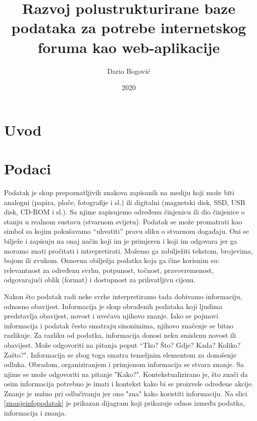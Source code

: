\documentclass{foi}
\title{Razvoj polustrukturirane baze podataka za potrebe internetskog foruma kao web-aplikacije}
\author{Dario Bogović}
\date{2020}
\begin{document}
\maketitle

\tableofcontents

\pagestyle{plain}
\chapter{Uvod}

\chapter{Podaci}

Podatak je skup prepoznatljivih znakova zapisanih na mediju koji može biti analogni (papira, ploče, fotografije i sl.)  ili digitalni (magnetski disk, SSD, USB disk, CD-ROM i sl.). Sa njime zapisujemo određenu činjenicu ili dio činjenice o stanju u realnom sustavu (stvarnom svijetu). Podatak se može promatrati kao simbol sa kojim pokušavamo “uhvatiti” pravu sliku o stvarnom događaju. Oni se bilježe i zapisuju na onaj način koji im je primjeren i koji im odgovara jer ga moramo znati pročitati i intrepretirati. Možemo ga zabilježiti tekstom, brojevima, bojom ili zvukom. Osnovna obilježja podatka koja ga čine korisnim su: relevantnost za određenu svrhu, potpunost, točnost, pravovremenost, odgovarajući oblik (format) i dostupnost za prihvatljivu cijenu. 

Nakon što podatak radi neke svrhe interpretiramo tada dobivamo informaciju, odnosno obavijest. Informacija je skup obrađenih podataka koji ljudima predstavlja obavijest, novost i uvećava njihovo znanje. Iako se pojmovi informacija i podatak često smatraju sinonimima, njihovo značenje se bitno razlikuje. Za razliku od podatka, informacija donosi neku smislenu novost ili obavijest. Može odgovoriti na pitanja poput “Tko? Što? Gdje? Kada? Koliko? Zašto?". Informacija se zbog toga smatra temeljnim elementom za donošenje odluka. Obradom, organiziranjem i primjenom informacija se stvara znanje. Sa njime se može odgovoriti na pitanje "Kako?". Kontekstualizirano je, što znači da osim informacija potrebno je imati i kontekst kako bi se proizvele određene akcije. Znanje je nužno pri odlučivanju jer ono "zna" kako koristiti informaciju. \cite{poslovnoRacunarstvo} Na slici \ref{znanjeinfopodatak} je prikazan dijagram koji prikazuje odnos između podatka, informacija i znanja.
\end{document}
